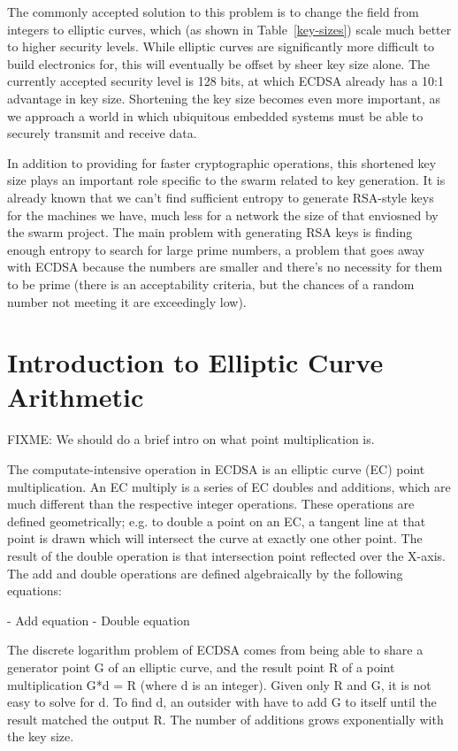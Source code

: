 \documentclass[twocolumn]{article}
\begin{document}
The commonly accepted solution to this problem is to change the field
from integers to elliptic curves, which (as shown in
Table~\ref{key-sizes}) scale much better to higher security levels.
While elliptic curves are significantly more difficult to build
electronics for, this will eventually be offset by sheer key size
alone.  The currently accepted security level is 128 bits, at which
ECDSA already has a 10:1 advantage in key size.  Shortening the key 
size becomes even more important, as we approach a world in which 
ubiquitous embedded systems must be able to securely transmit and 
receive data.

In addition to providing for faster cryptographic operations, this
shortened key size plays an important role specific to the swarm
related to key generation.  It is already known\cite{halderman-shared}
that we can't find sufficient entropy to generate RSA-style keys for
the machines we have, much less for a network the size of that
enviosned by the swarm project.  The main problem with generating RSA
keys is finding enough entropy to search for large prime numbers, a
problem that goes away with ECDSA because the numbers are smaller and
there's no necessity for them to be prime (there is an acceptability
criteria, but the chances of a random number not meeting it are
exceedingly low).

\section{Introduction to Elliptic Curve Arithmetic}

FIXME: We should do a brief intro on what point multiplication is.

The computate-intensive operation in ECDSA is an elliptic curve (EC) point 
multiplication. An EC multiply is a series of EC doubles and additions, which
are much different than the respective integer operations. These operations
are defined geometrically; e.g. to double a point on an EC, a tangent line at that
point is drawn which will intersect the curve at exactly one other point. The result 
of the double operation is that intersection point reflected over the X-axis.
The add and double operations are defined algebraically by the following equations:

- Add equation
- Double equation

The discrete logarithm problem of ECDSA comes from being able to share a generator point
G of an elliptic curve, and the result point R of a point multiplication G*d = R 
(where d is an integer). Given only R and G, it is not easy to solve for d. To find d, an
outsider with have to add G to itself until the result matched the output R. The number
of additions grows exponentially with the key size.
\end{document}
